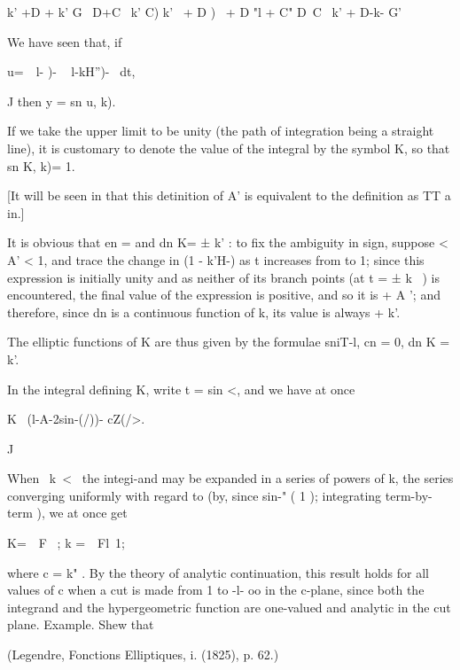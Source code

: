 k' +D + k' G \ D+C \ k' C) k' \ + D ) \ + D "l + C" D~C ~k' + D-k- G'


We have seen that, if

u=\ \ l- )- ~ l-kH'')- ~dt,

J then y = sn u, k).

If we take the upper limit to be unity (the path of integration being
a straight line), it is customary to denote the value of the integral
by the symbol K, so that sn K, k)= 1.

[It will be seen in that this detinition of A' is equivalent
to the definition as TT a in.]

%
%

It is obvious that en = and dn K= ± k' : to fix the ambiguity in sign,
suppose < A' < 1, and trace the change in (1 - k'H-) as t increases
from to 1; since this expression is initially unity and as neither of
its branch points (at t = ± k~ ) is encountered, the final value of
the expression is positive, and so it is + A '; and therefore, since
dn is a continuous function of k, its value is always + k'.

The elliptic functions of K are thus given by the formulae sniT-l, cn
= 0, dn K = k'.


In the integral defining K, write t = sin <, and we have at once

K \ (l-A-2sin-(/))- cZ(/>.

J

When \ k\ < \, the integi-and may be expanded in a series of powers of
k, the series converging uniformly with regard to (by, since
sin-" ( 1 ); integrating term-by-term ), we at once get

K=\ \ F \, ; k =\ \ Fl\, 1;

where c = k" . By the theory of analytic continuation, this result
holds for all values of c when a cut is made from 1 to -l- oo in the
c-plane, since both the integrand and the hypergeometric function are
one-valued and analytic in the cut plane. Example. Shew that

(Legendre, Fonctions Elliptiques, i. (1825), p. 62.)


